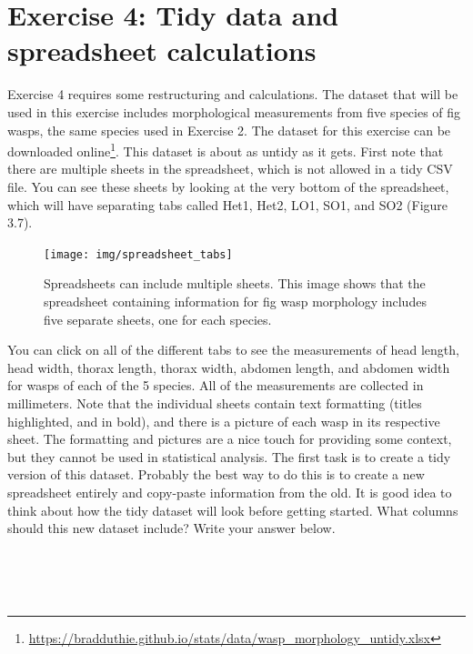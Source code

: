 \documentclass[
]{scrbook}
\begin{document}
\hypertarget{exercise-4-tidy-data-and-spreadsheet-calculations}{%
\section{Exercise 4: Tidy data and spreadsheet calculations}\label{exercise-4-tidy-data-and-spreadsheet-calculations}}

Exercise 4 requires some restructuring and calculations.
The dataset that will be used in this exercise includes morphological measurements from five species of fig wasps, the same species used in Exercise 2.
The dataset for this exercise can be downloaded online\footnote{\url{https://bradduthie.github.io/stats/data/wasp_morphology_untidy.xlsx}}.
This dataset is about as untidy as it gets.
First note that there are multiple sheets in the spreadsheet, which is not allowed in a tidy CSV file.
You can see these sheets by looking at the very bottom of the spreadsheet, which will have separating tabs called Het1, Het2, LO1, SO1, and SO2 (Figure 3.7).

\begin{figure}
\texttt{[image: img/spreadsheet\_tabs]} \caption{Spreadsheets can include multiple sheets. This image shows that the spreadsheet containing information for fig wasp morphology includes five separate sheets, one for each species.}\label{fig:unnamed-chunk-18}
\end{figure}

You can click on all of the different tabs to see the measurements of head length, head width, thorax length, thorax width, abdomen length, and abdomen width for wasps of each of the 5 species.
All of the measurements are collected in millimeters.
Note that the individual sheets contain text formatting (titles highlighted, and in bold), and there is a picture of each wasp in its respective sheet.
The formatting and pictures are a nice touch for providing some context, but they cannot be used in statistical analysis.
The first task is to create a tidy version of this dataset.
Probably the best way to do this is to create a new spreadsheet entirely and copy-paste information from the old.
It is good idea to think about how the tidy dataset will look before getting started.
What columns should this new dataset include? Write your answer below.

\begin{verbatim}




\end{verbatim}
\end{document}
